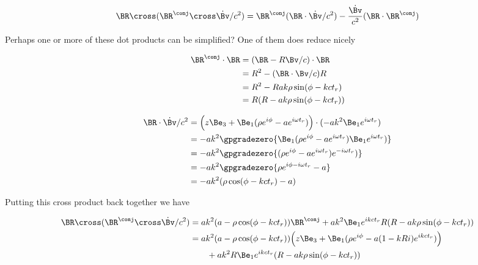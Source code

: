 {\begin{equation}\label{eqn:relativisticElectrodynamicsExamReflection:620}
\BR \cross (\BR^\conj \cross \dot{\Bv}/c^2) 
=
\BR^\conj (\BR \cdot \dot{\Bv}/c^2) 
- \frac{\dot{\Bv}}{c^2}
(\BR \cdot \BR^\conj)
\end{equation}

Perhaps one or more of these dot products can be simplified?  One of them does reduce nicely

\begin{equation}\label{eqn:relativisticElectrodynamicsExamReflection:1110}
\begin{aligned}
\BR^\conj \cdot \BR 
&= ( \BR - R \Bv/c ) \cdot \BR  \\
&= R^2 - (\BR \cdot \Bv/c) R \\
&= R^2 - R a k \rho \sin(\phi - k c t_r) \\
&= R(R - a k \rho \sin(\phi - k c t_r))
\end{aligned}
\end{equation}

\begin{equation}\label{eqn:relativisticElectrodynamicsExamReflection:1130}
\begin{aligned}
\BR \cdot \dot{\Bv}/c^2
&=
\Bigl(z \Be_3 + \Be_1 (\rho e^{i \phi} - a e^{i \omega t_r} ) \Bigr) \cdot
(-a k^2 \Be_1 e^{i \omega t_r} )  \\
&=
- a k^2 \gpgradezero{
\Be_1 (\rho e^{i \phi} - a e^{i \omega t_r} ) 
\Be_1 e^{i \omega t_r} )  
} \\
&=
- a k^2 \gpgradezero{
(\rho e^{i \phi} - a e^{i \omega t_r} ) 
e^{-i \omega t_r} )  
} \\
&=
- a k^2 \gpgradezero{
\rho e^{i \phi - i \omega t_r} - a 
} \\
&=
- a k^2 ( \rho \cos(\phi - k c t_r) - a )
\end{aligned}
\end{equation}

Putting this cross product back together we have

\begin{equation}\label{eqn:relativisticElectrodynamicsExamReflection:1150}
\begin{aligned}
\BR \cross (\BR^\conj \cross \dot{\Bv}/c^2)
&=
a k^2 ( a -\rho \cos(\phi - k c t_r) ) \BR^\conj 
+a k^2 \Be_1 e^{i k c  t_r} R(R - a k \rho \sin(\phi - k c t_r)) \\
&=
a k^2 ( a -\rho \cos(\phi - k c t_r) ) \Bigl(
z \Be_3 + \Be_1 (\rho e^{i \phi} - a (1 - k R i) e^{i k c t_r} )
\Bigr) \\
&\qquad +a k^2 R \Be_1 e^{i k c  t_r} (R - a k \rho \sin(\phi - k c t_r)) 
\end{aligned}
\end{equation}

}
